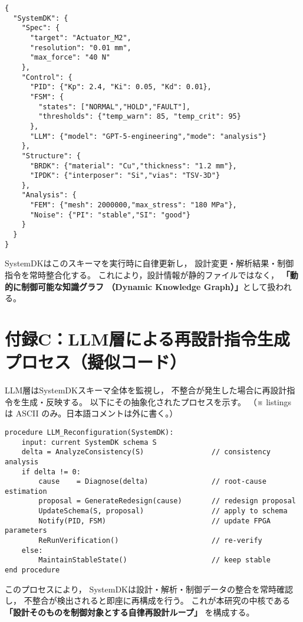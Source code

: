 \begin{lstlisting}[caption={SystemDK schema example},label={lst:sdk_schema}]
{
  "SystemDK": {
    "Spec": {
      "target": "Actuator_M2",
      "resolution": "0.01 mm",
      "max_force": "40 N"
    },
    "Control": {
      "PID": {"Kp": 2.4, "Ki": 0.05, "Kd": 0.01},
      "FSM": {
        "states": ["NORMAL","HOLD","FAULT"],
        "thresholds": {"temp_warn": 85, "temp_crit": 95}
      },
      "LLM": {"model": "GPT-5-engineering","mode": "analysis"}
    },
    "Structure": {
      "BRDK": {"material": "Cu","thickness": "1.2 mm"},
      "IPDK": {"interposer": "Si","vias": "TSV-3D"}
    },
    "Analysis": {
      "FEM": {"mesh": 2000000,"max_stress": "180 MPa"},
      "Noise": {"PI": "stable","SI": "good"}
    }
  }
}
\end{lstlisting}

SystemDKはこのスキーマを実行時に自律更新し，
設計変更・解析結果・制御指令を常時整合化する。
これにより，設計情報が静的ファイルではなく，
\textbf{「動的に制御可能な知識グラフ
（Dynamic Knowledge Graph）」}として扱われる。

\section*{付録C：LLM層による再設計指令生成プロセス（擬似コード）}

LLM層はSystemDKスキーマ全体を監視し，
不整合が発生した場合に再設計指令を生成・反映する。
以下にその抽象化されたプロセスを示す。
（※ listings は ASCII のみ。日本語コメントは外に書く。）

\begin{lstlisting}[caption={LLM-driven redesign procedure},label={lst:llm_proc}]
procedure LLM_Reconfiguration(SystemDK):
    input: current SystemDK schema S
    delta = AnalyzeConsistency(S)                // consistency analysis
    if delta != 0:
        cause    = Diagnose(delta)               // root-cause estimation
        proposal = GenerateRedesign(cause)       // redesign proposal
        UpdateSchema(S, proposal)                // apply to schema
        Notify(PID, FSM)                         // update FPGA parameters
        ReRunVerification()                      // re-verify
    else:
        MaintainStableState()                    // keep stable
end procedure
\end{lstlisting}

このプロセスにより，
SystemDKは設計・解析・制御データの整合を常時確認し，
不整合が検出されると即座に再構成を行う。
これが本研究の中核である
\textbf{「設計そのものを制御対象とする自律再設計ループ」}
を構成する。

